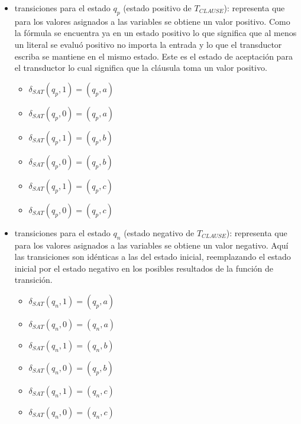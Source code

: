 \begin{itemize}
    \item transiciones para el estado $q_p$ (estado positivo de $T_{CLAUSE}$): representa que para los valores asignados a las variables
          se obtiene un valor positivo.  Como la fórmula se encuentra ya en un estado positivo lo que significa que al menos un literal
          se evaluó positivo no importa la entrada y lo que el transductor escriba se mantiene en el mismo estado. Este es el estado de
          aceptación para el transductor lo cual significa que la cláusula toma un valor positivo.
          \begin{multicols}{2}
              \begin{itemize}
                  \item $\delta_{SAT}(q_{p},1)=(q_{p},a)$
                  \item $\delta_{SAT}(q_{p},0)=(q_{p},a)$
                  \item $\delta_{SAT}(q_{p},1)=(q_{p},b)$
                  \item $\delta_{SAT}(q_{p},0)=(q_{p},b)$
                  \item $\delta_{SAT}(q_{p},1)=(q_{p},c)$
                  \item $\delta_{SAT}(q_{p},0)=(q_{p},c)$
              \end{itemize}
          \end{multicols}

    \item transiciones para el estado $q_n$ (estado negativo de $T_{CLAUSE}$): representa que para los valores asignados a las variables
          se obtiene un valor negativo. Aquí las transiciones son idénticas a las del estado
          inicial, reemplazando el estado inicial por el estado negativo en los posibles resultados de la función de
          transición.

          \begin{multicols}{2}
              \begin{itemize}
                  \item $\delta_{SAT}(q_{n},1)=(q_{p},a)$
                  \item $\delta_{SAT}(q_{n},0)=(q_{n},a)$
                  \item $\delta_{SAT}(q_{n},1)=(q_{n},b)$
                  \item $\delta_{SAT}(q_{n},0)=(q_{p},b)$
                  \item $\delta_{SAT}(q_{n},1)=(q_{n},c)$
                  \item $\delta_{SAT}(q_{n},0)=(q_{n},c)$
              \end{itemize}
          \end{multicols}
\end{itemize}

